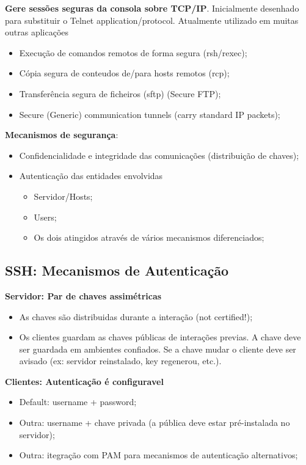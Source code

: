 \documentclass{article}
\begin{document}
\begin{flushleft}
  \textbf{Gere sessões seguras da consola sobre TCP/IP}. Inicialmente desenhado
  para substituir o Telnet application/protocol. Atualmente utilizado
  em muitas outras aplicações\begin{itemize}
    \item Execução de comandos remotos de forma segura (rsh/rexec);
    \item Cópia segura de conteudos de/para hosts remotos (rcp);
    \item Transferência segura de ficheiros (sftp) (Secure FTP);
    \item Secure (Generic) communication tunnels (carry standard IP packets);
  \end{itemize}

  \pagebreak

  \textbf{Mecanismos de segurança}:
  \begin{itemize}
    \item Confidencialidade e integridade das comunicações (distribuição de chaves);
    \item Autenticação das entidades envolvidas
    \begin{itemize}
      \item Servidor/Hosts;
      \item Users;
      \item Os dois atingidos através de vários mecanismos diferenciados;
    \end{itemize}
  \end{itemize}
\end{flushleft}

\subsection{SSH: Mecanismos de Autenticação}

\begin{flushleft}
  \textbf{Servidor: Par de chaves assimétricas}
  \begin{itemize}
    \item As chaves são distribuidas durante a interação (not certified!);
    \item Os clientes guardam as chaves públicas de interações previas.
    A chave deve ser guardada em ambientes confiados. Se a chave mudar o cliente
    deve ser avisado (ex: servidor reinstalado, key regenerou, etc.).
  \end{itemize}

  \vspace{2mm}

  \textbf{Clientes: Autenticação é configuravel}
  \begin{itemize}
    \item Default: username + password;
    \item Outra: username + chave privada (a pública deve estar pré-instalada no servidor);
    \item Outra: itegração com PAM para mecanismos de autenticação alternativos;
  \end{itemize}
\end{flushleft}
\end{document}

